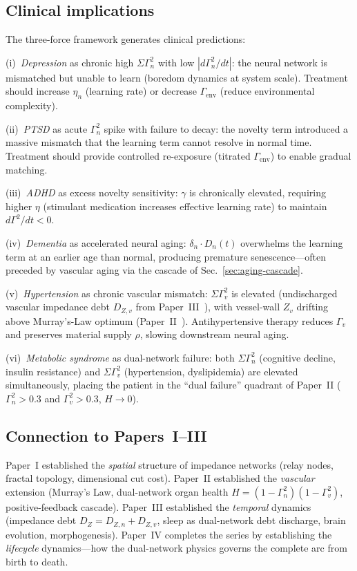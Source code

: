 ﻿\documentclass[aps,pre,twocolumn,superscriptaddress,floatfix]{revtex4-2}
\begin{document}
\subsection{Clinical implications}

The three-force framework generates clinical predictions:

(i)~\emph{Depression} as chronic high $\Sigma\Gamma_n^2$
with low $|d\Gamma_n^2/dt|$:
the neural network is mismatched but unable to learn
(boredom dynamics at system scale).
Treatment should increase $\eta_n$ (learning rate)
or decrease $\Gamma_{\mathrm{env}}$
(reduce environmental complexity).

(ii)~\emph{PTSD} as acute $\Gamma_n^2$ spike with
failure to decay:
the novelty term introduced a massive mismatch that
the learning term cannot resolve in normal time.
Treatment should provide controlled re-exposure
(titrated $\Gamma_{\mathrm{env}}$) to enable
gradual matching.

(iii)~\emph{ADHD} as excess novelty sensitivity:
$\gamma$ is chronically elevated, requiring
higher $\eta$ (stimulant medication increases
effective learning rate) to maintain
$d\Gamma^2/dt < 0$.

(iv)~\emph{Dementia} as accelerated neural aging:
$\delta_n \cdot D_n(t)$ overwhelms the learning term
at an earlier age than normal, producing premature
senescence---often preceded by vascular aging via
the cascade of Sec.~\ref{sec:aging-cascade}.

(v)~\emph{Hypertension} as chronic vascular mismatch:
$\Sigma\Gamma_v^2$ is elevated (undischarged vascular
impedance debt $D_{Z,v}$ from Paper~III~\cite{PaperIII}),
with vessel-wall $Z_v$ drifting above Murray's-Law optimum
(Paper~II~\cite{PaperII}).
Antihypertensive therapy reduces $\Gamma_v$ and preserves
material supply $\rho$, slowing downstream neural aging.

(vi)~\emph{Metabolic syndrome} as dual-network failure:
both $\Sigma\Gamma_n^2$ (cognitive decline, insulin resistance)
and $\Sigma\Gamma_v^2$ (hypertension, dyslipidemia) are
elevated simultaneously, placing the patient in the
``dual failure'' quadrant of Paper~II
($\Gamma_n^2 > 0.3$ and $\Gamma_v^2 > 0.3$,
$H \to 0$).


\subsection{Connection to Papers~I--III}

Paper~I established the \emph{spatial} structure
of impedance networks (relay nodes, fractal topology,
dimensional cut cost).
Paper~II established the \emph{vascular} extension
(Murray's Law, dual-network organ health
$H = (1-\Gamma_n^2)(1-\Gamma_v^2)$,
positive-feedback cascade).
Paper~III established the \emph{temporal} dynamics
(impedance debt $D_Z = D_{Z,n} + D_{Z,v}$,
sleep as dual-network debt discharge,
brain evolution, morphogenesis).
Paper~IV completes the series by establishing
the \emph{lifecycle} dynamics---how the dual-network
physics governs the complete arc from birth to death.
\end{document}
